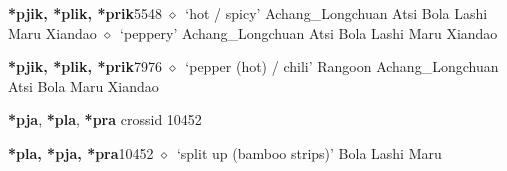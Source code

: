   \begin{list}{}{\leftmargin=1.5em \itemindent=-1.5em}
  \item {\footnotesize \textbf{*pjik, *plik, *prik}}{\tiny 5548}
         $\diamond$~`hot / spicy'
         Achang\_Longchuan 
\hspace{1ex}
         Atsi 
\hspace{1ex}
         Bola 
\hspace{1ex}
         Lashi 
\hspace{1ex}
         Maru 
\hspace{1ex}
         Xiandao 
\hspace{1ex}
         $\diamond$~`peppery'
         Achang\_Longchuan 
\hspace{1ex}
         Atsi 
\hspace{1ex}
         Bola 
\hspace{1ex}
         Lashi 
\hspace{1ex}
         Maru 
\hspace{1ex}
         Xiandao 
  \item {\footnotesize \textbf{*pjik, *plik, *prik}}{\tiny 7976}
\hspace{1ex}
         $\diamond$~`pepper (hot) / chili'
         Rangoon 
\hspace{1ex}
         Achang\_Longchuan 
\hspace{1ex}
         Atsi 
\hspace{1ex}
         Bola 
\hspace{1ex}
         Maru 
\hspace{1ex}
         Xiandao 
  \end{list}
\item
\textbf{*pja}, \textbf{*pla}, \textbf{*pra}
  {\tiny crossid 10452}
  \begin{list}{}{\leftmargin=1.5em \itemindent=-1.5em}
  \item {\footnotesize \textbf{*pla, *pja, *pra}}{\tiny 10452}
         $\diamond$~`split up (bamboo strips)'
         Bola 
\hspace{1ex}
         Lashi 
\hspace{1ex}
         Maru 
  \end{list}
